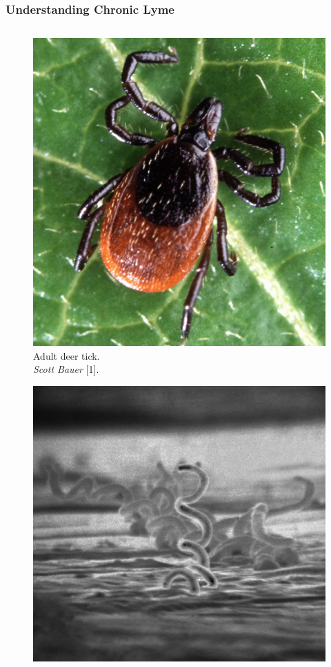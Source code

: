 \documentclass[usenames,dvipsnames,15pt,handout]{beamer}
\begin{document}
\begin{frame}
  \frametitle{Understanding Chronic Lyme}
  \begin{columns}
    \begin{column}{.25\textwidth}
      \begin{figure}
        \vspace{-.5cm}
        \includegraphics[scale=.35]{pictures/tick.jpg}\\
        {\tiny Adult deer tick.\\\vspace{-.2cm}\emph{Scott Bauer} [1].}
      \end{figure}\vspace{-1.25cm}
      \begin{figure}
        \includegraphics[scale=1.4]{pictures/spiro.jpg}\\

\end{figure}
\end{column}
\end{columns}
\end{frame}
\end{document}
